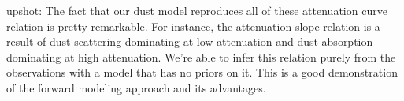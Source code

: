 upshot: 
The fact that our dust model reproduces all of these attenuation curve relation
is pretty remarkable. For instance, the attenuation-slope relation is a result 
of dust scattering dominating at low attenuation and dust absorption dominating 
at high attenuation. We're able to infer this relation purely from the observations 
with a model that has no priors on it. This is a good demonstration of the forward 
modeling approach and its advantages.  




